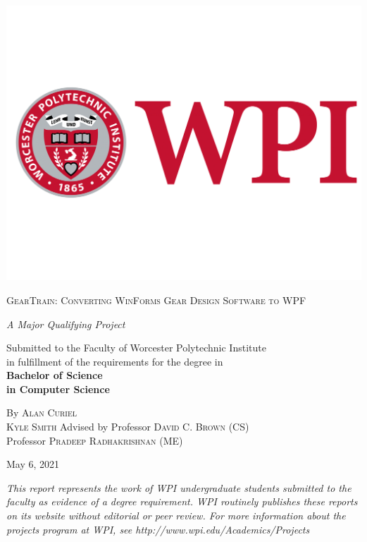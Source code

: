 \begin{center}

\includegraphics[scale=0.075]{images/WPI_Inst_Prim_FulClr.png}

{\LARGE\textsc{GearTrain: Converting WinForms Gear Design Software to WPF}\par}
\normalsize
\par\vspace{0.05\textheight}
\emph{A Major Qualifying Project}

\medbreak
Submitted to the Faculty of Worcester Polytechnic Institute \\ in fulfillment of the requirements for the degree in \\ \vspace{0.033\textheight}
\textbf{Bachelor of Science \\ in Computer Science}
\par\vspace{.033\textheight}
By
\medbreak
\textsc{Alan Curiel \\ Kyle Smith}
\bigbreak
Advised by
\medbreak
Professor \textsc{David C. Brown} (CS) \\
Professor \textsc{Pradeep Radhakrishnan} (ME)

\vspace{0.033\textheight}
May 6, 2021

\vspace*{\fill}
\footnotesize\emph{This report represents the work of WPI undergraduate students submitted to the faculty as
evidence of a degree requirement. WPI routinely publishes these reports on its website without
editorial or peer review. For more information about the projects program at WPI, see http://www.wpi.edu/Academics/Projects}
\end{center}